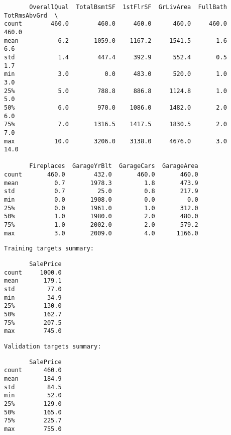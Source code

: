 \documentclass[11pt]{article}
\begin{document}
    
    \begin{verbatim}
       OverallQual  TotalBsmtSF  1stFlrSF  GrLivArea  FullBath  TotRmsAbvGrd  \
count        460.0        460.0     460.0      460.0     460.0         460.0   
mean           6.2       1059.0    1167.2     1541.5       1.6           6.6   
std            1.4        447.4     392.9      552.4       0.5           1.7   
min            3.0          0.0     483.0      520.0       1.0           3.0   
25%            5.0        788.8     886.8     1124.8       1.0           5.0   
50%            6.0        970.0    1086.0     1482.0       2.0           6.0   
75%            7.0       1316.5    1417.5     1830.5       2.0           7.0   
max           10.0       3206.0    3138.0     4676.0       3.0          14.0   

       Fireplaces  GarageYrBlt  GarageCars  GarageArea  
count       460.0        432.0       460.0       460.0  
mean          0.7       1978.3         1.8       473.9  
std           0.7         25.0         0.8       217.9  
min           0.0       1908.0         0.0         0.0  
25%           0.0       1961.0         1.0       312.0  
50%           1.0       1980.0         2.0       480.0  
75%           1.0       2002.0         2.0       579.2  
max           3.0       2009.0         4.0      1166.0  
    \end{verbatim}

    
    \begin{Verbatim}[commandchars=\\\{\}]
Training targets summary:

    \end{Verbatim}

    
    \begin{verbatim}
       SalePrice
count     1000.0
mean       179.1
std         77.0
min         34.9
25%        130.0
50%        162.7
75%        207.5
max        745.0
    \end{verbatim}

    
    \begin{Verbatim}[commandchars=\\\{\}]
Validation targets summary:

    \end{Verbatim}

    
    \begin{verbatim}
       SalePrice
count      460.0
mean       184.9
std         84.5
min         52.0
25%        129.0
50%        165.0
75%        225.7
max        755.0
    \end{verbatim}
\end{document}
